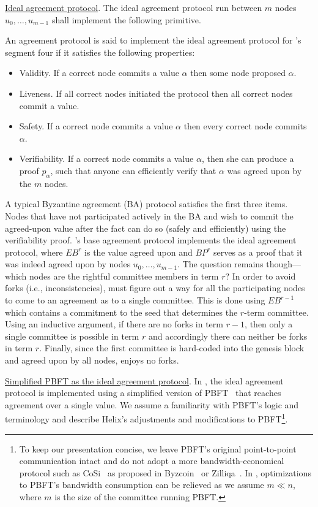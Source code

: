 \underline{Ideal agreement protocol}. 
The ideal agreement protocol run between $m$ nodes $u_{0},\dots,u_{m-1}$ shall implement the following primitive.
\begin{definition}\label{Protocol:BBP}
An agreement protocol is said to implement the ideal agreement protocol for \nameNS's segment four if it satisfies the following properties:
\begin{itemize}
\item Validity. If a correct node commits a value $\alpha$ then some node proposed $\alpha$.
\item Liveness. If all correct nodes initiated the protocol then all correct nodes commit a value.
\item Safety. If a correct node commits a value $\alpha$ then every correct node commits $\alpha$.
\item Verifiability. If a correct node commits a value $\alpha$, then she can produce a proof $p_{\alpha}$, such that anyone can efficiently verify that $\alpha$ was agreed upon by the $m$ nodes.
\end{itemize}
\end{definition}
A typical Byzantine agreement (BA) protocol satisfies the first three items. Nodes that have not participated actively in the BA and wish to commit the agreed-upon value after the fact can do so (safely and efficiently) using the verifiability proof. 
\nameNS's base agreement protocol implements the ideal agreement protocol, where $EB^r$ is the value agreed upon and $BP^r$ serves as a proof that it was indeed agreed upon by nodes $u_0,\dots,u_{m-1}$. The question remains though---which nodes are the rightful committee members in term $r$? In order to avoid forks (i.e., inconsistencies), \name must figure out a way for all the participating nodes to come to an agreement as to a single committee. This is done using $EB^{r-1}$ which contains a commitment to the seed that determines the $r$-term committee. Using an inductive argument, if there are no forks in term $r-1$, then only a single committee is possible in term $r$ and accordingly there can neither be forks in term $r$. Finally, since the first committee is hard-coded into the genesis block and agreed upon by all nodes, \name enjoys no forks. 

\underline{Simplified PBFT as the ideal agreement protocol}.
In \nameNS, the ideal agreement protocol is implemented using a simplified version of PBFT~\cite{PBFT} that reaches agreement over a single value. We assume a familiarity with PBFT's logic and terminology and describe Helix's adjustments and modifications to PBFT\footnote{To keep our presentation concise, we leave PBFT's original point-to-point communication intact and do not adopt a more bandwidth-economical protocol such as CoSi~\cite{CoSi} as proposed in Byzcoin~\cite{Byzcoin} or Zilliqa~\cite{Zilliqa}. In \nameNS, optimizations to PBFT's bandwidth consumption can be relieved as we assume $m \ll n$, where $m$ is the size of the committee running PBFT.}.

